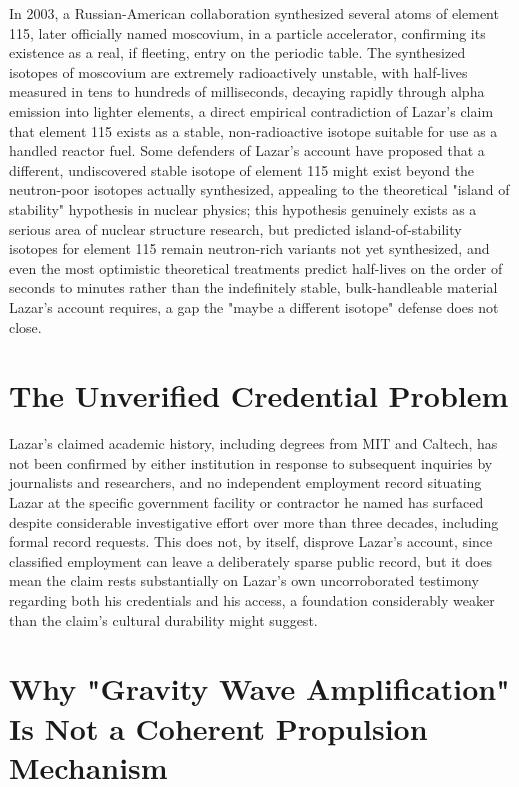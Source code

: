 \documentclass[11pt]{article}
\begin{document}
In 2003, a Russian-American collaboration synthesized several atoms of element 115, later officially named moscovium, in a particle accelerator, confirming its existence as a real, if fleeting, entry on the periodic table. The synthesized isotopes of moscovium are extremely radioactively unstable, with half-lives measured in tens to hundreds of milliseconds, decaying rapidly through alpha emission into lighter elements, a direct empirical contradiction of Lazar's claim that element 115 exists as a stable, non-radioactive isotope suitable for use as a handled reactor fuel. Some defenders of Lazar's account have proposed that a different, undiscovered stable isotope of element 115 might exist beyond the neutron-poor isotopes actually synthesized, appealing to the theoretical "island of stability" hypothesis in nuclear physics; this hypothesis genuinely exists as a serious area of nuclear structure research, but predicted island-of-stability isotopes for element 115 remain neutron-rich variants not yet synthesized, and even the most optimistic theoretical treatments predict half-lives on the order of seconds to minutes rather than the indefinitely stable, bulk-handleable material Lazar's account requires, a gap the "maybe a different isotope" defense does not close.

\section{The Unverified Credential Problem}

Lazar's claimed academic history, including degrees from MIT and Caltech, has not been confirmed by either institution in response to subsequent inquiries by journalists and researchers, and no independent employment record situating Lazar at the specific government facility or contractor he named has surfaced despite considerable investigative effort over more than three decades, including formal record requests. This does not, by itself, disprove Lazar's account, since classified employment can leave a deliberately sparse public record, but it does mean the claim rests substantially on Lazar's own uncorroborated testimony regarding both his credentials and his access, a foundation considerably weaker than the claim's cultural durability might suggest.

\section{Why "Gravity Wave Amplification" Is Not a Coherent Propulsion Mechanism}
\end{document}
